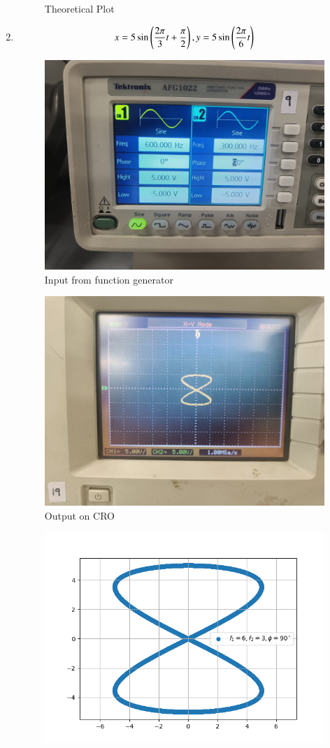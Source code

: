 \documentclass[journal]{IEEEtran}
\begin{document}
\begin{enumerate}
\begin{figure}[H]
        \caption{Theoretical Plot}
    \end{figure}
    \item \begin{align}
        x = 5\sin\left(\frac{2\pi}{3}t+\frac{\pi}{2}\right), y = 5\sin\left(\frac{2\pi}{6}t\right)
    \end{align}
    \begin{figure}[H]
        \centering
        \includegraphics[width=0.7\columnwidth]{pics/WhatsApp Image 2025-01-24 at 11.02.17.jpeg}
        \caption{Input from function generator}
    \end{figure}
    \begin{figure}[H]
        \centering
        \includegraphics[width=0.7\columnwidth]{pics/WhatsApp Image 2025-01-24 at 11.02.16(3).jpeg}
        \caption{Output on CRO}
    \end{figure}
    \begin{figure}[H]
        \centering
        \includegraphics[width=0.7\columnwidth]{figs/fig4.png}

\end{figure}
\end{enumerate}
\end{document}
